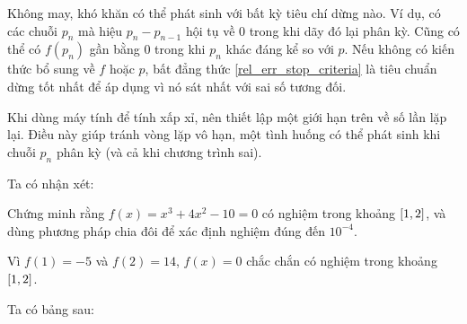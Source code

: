 \documentclass[../../Lectures.tex]{subfiles}
\begin{document}
Không may, khó khăn có thể phát sinh với bất kỳ tiêu chí dừng nào. Ví dụ, có các
chuỗi \(p_n\) mà hiệu \(p_n - p_{n - 1}\) hội tụ về \num{0} trong khi dãy đó lại
phân kỳ. Cũng có thể có \(f(p_n)\) gần bằng \num{0} trong khi \(p_n\) khác đáng
kể so với \(p\). Nếu không có kiến thức bổ sung về \(f\) hoặc \(p\), bất đẳng
thức \ref{rel_err_stop_criteria} là tiêu chuẩn dừng tốt nhất để áp dụng vì nó
sát nhất với sai số tương đối.

Khi dùng máy tính để tính xấp xỉ, nên thiết lập một giới hạn trên về số lần lặp
lại. Điều này giúp tránh vòng lặp vô hạn, một tình huống có thể phát sinh khi
chuỗi \(p_n\) phân kỳ (và cả khi chương trình sai).

Ta có nhận xét:

\begin{exmp}
    Chứng minh rằng \(f(x) = x^3 + 4x^2 - 10 = 0\) có nghiệm trong khoảng
    \(\interval{1}{2}\), và dùng phương pháp chia đôi để xác định nghiệm đúng
    đến \(10^{-4}\).

    Vì \(f(1) = -5\) và \(f(2) = 14\), \(f(x) = 0\) chắc chắn có nghiệm trong
    khoảng \(\interval{1}{2}\).

    Ta có bảng sau:


\end{exmp}
\end{document}
